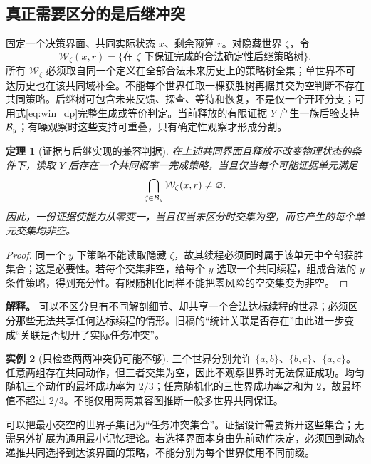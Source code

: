 \documentclass[11pt,a4paper,fontset=fandol]{ctexart}
\newtheorem{theorem}{定理}[section]
\theoremstyle{definition}
\newtheorem{example}[theorem]{实例}
\theoremstyle{remark}\newtheorem{remark}[theorem]{说明}
\numberwithin{equation}{section}
\begin{document}
\subsection{真正需要区分的是后继冲突}
固定一个决策界面、共同实际状态 $x$、剩余预算 $r$。对隐藏世界 $\zeta$，令
\begin{equation}
 \mathcal W_\zeta(x,r)=\{\text{在 }\zeta\text{ 下保证完成的合法确定性后继策略树}\}.
 \label{eq:winning_trees}
\end{equation}
所有 $\mathcal W_\zeta$ 必须取自同一个定义在全部合法未来历史上的策略树全集；单世界不可达历史也在该共同域补全。不能每个世界任取一棵获胜树再据其交为空判断不存在共同策略。后继树可包含未来反馈、探查、等待和恢复，不是仅一个开环分支；可用式\eqref{eq:win_dp}完整生成或等价判定。当前释放的有限证据 $Y$ 产生一族后验支持 $\mathcal B_y$；有噪观察时这些支持可重叠，只有确定性观察才形成分割。

\begin{theorem}[证据与后继实现的兼容判据]
\label{thm:partition}
在上述共同界面且释放不改变物理状态的条件下，读取 $Y$ 后存在一个共同概率一完成策略，当且仅当每个可能证据单元满足
\begin{equation}
 \bigcap_{\zeta\in\mathcal B_y}\mathcal W_\zeta(x,r)\ne\varnothing.
 \label{eq:intersection}
\end{equation}
因此，一份证据使能力从零变一，当且仅当未区分时交集为空，而它产生的每个单元交集均非空。
\end{theorem}
\begin{proof}
同一个 $y$ 下策略不能读取隐藏 $\zeta$，故其续程必须同时属于该单元中全部获胜集合；这是必要性。若每个交集非空，给每个 $y$ 选取一个共同续程，组成合法的 $y$ 条件策略，得到充分性。有限随机化同样不能把零风险的空交集变为非空。
\end{proof}

\textbf{解释。} 可以不区分具有不同解剖细节、却共享一个合法达标续程的世界；必须区分那些无法共享任何达标续程的情形。旧稿的“统计关联是否存在”由此进一步变成“关联是否切开了实际任务冲突”。

\begin{example}[只检查两两冲突仍可能不够]
三个世界分别允许 $\{a,b\}$、$\{b,c\}$、$\{a,c\}$。任意两组存在共同动作，但三者交集为空，因此不观察世界时无法保证成功。均匀随机三个动作的最坏成功率为 $2/3$；任意随机化的三世界成功率之和为 $2$，故最坏值不超过 $2/3$。不能仅用两两兼容图推断一般多世界共同保证。
\end{example}
可以把最小交空的世界子集记为“任务冲突集合”。证据设计需要拆开这些集合；无需另外扩展为通用最小记忆理论。若选择界面本身由先前动作决定，必须回到动态递推共同选择到达该界面的策略，不能分别为每个世界使用不同前缀。
\end{document}

